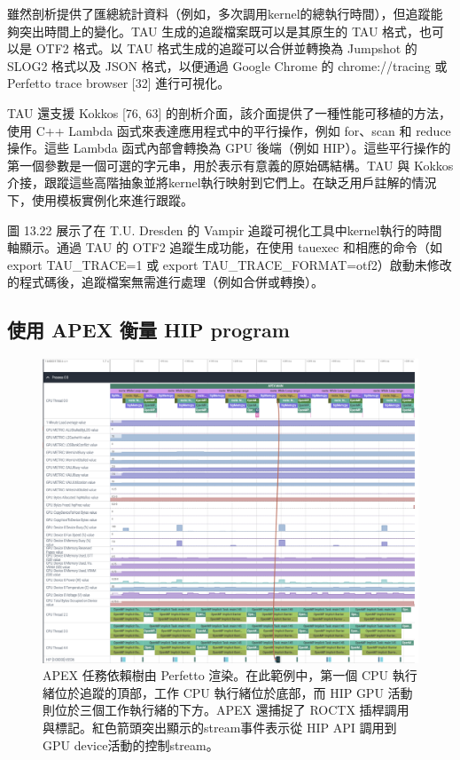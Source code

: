 雖然剖析提供了匯總統計資料（例如，多次調用kernel的總執行時間），但追蹤能夠突出時間上的變化。TAU 生成的追蹤檔案既可以是其原生的 TAU 格式，也可以是 OTF2 格式。以 TAU 格式生成的追蹤可以合併並轉換為 Jumpshot 的 SLOG2 格式以及 JSON 格式，以便通過 Google Chrome 的 chrome://tracing 或 Perfetto trace browser [32] 進行可視化。

TAU 還支援 Kokkos [76, 63] 的剖析介面，該介面提供了一種性能可移植的方法，使用 C++ Lambda 函式來表達應用程式中的平行操作，例如 for、scan 和 reduce 操作。這些 Lambda 函式內部會轉換為 GPU 後端（例如 HIP）。這些平行操作的第一個參數是一個可選的字元串，用於表示有意義的原始碼結構。TAU 與 Kokkos 介接，跟蹤這些高階抽象並將kernel執行映射到它們上。在缺乏用戶註解的情況下，使用模板實例化來進行跟蹤。

圖 13.22 展示了在 T.U. Dresden 的 Vampir 追蹤可視化工具中kernel執行的時間軸顯示。通過 TAU 的 OTF2 追蹤生成功能，在使用 tauexec 和相應的命令（如 export TAU\_TRACE=1 或 export TAU\_TRACE\_FORMAT=otf2）啟動未修改的程式碼後，追蹤檔案無需進行處理（例如合併或轉換）。


\subsection{使用 APEX 衡量 HIP program}

\begin{figure}
    \centering
    \includegraphics[width=0.9\linewidth]{FileAusiliari/Screenshots/Figure13-20.png}
    \caption{APEX 任務依賴樹由 Perfetto 渲染。在此範例中，第一個 CPU 執行緒位於追蹤的頂部，工作 CPU 執行緒位於底部，而 HIP GPU 活動則位於三個工作執行緒的下方。APEX 還捕捉了 ROCTX 插桿調用與標記。紅色箭頭突出顯示的stream事件表示從 HIP API 調用到 GPU device活動的控制stream。}
    \label{fig:PAPI20}
\end{figure}


